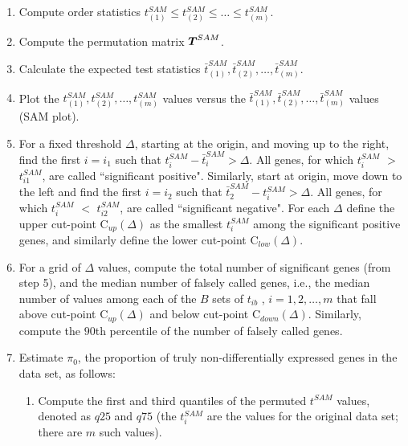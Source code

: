 \documentclass[10pt]{article}
\newcommand{\T}{\mbox{\boldmath $T$}}
\begin{document}
\begin{enumerate}

\item Compute order statistics $t_{(1)}^{SAM} \le t_{(2)}^{SAM} \le
\dots \le t_{(m)}^{SAM}$.

\item Compute the permutation matrix $\T^{SAM}$.

\item Calculate the expected test statistics
$\bar{t}_{(1)}^{SAM},\bar{t}_{(2)}^{SAM},\dots,\bar{t}_{(m)}^{SAM}$.

\item Plot the $t_{(1)}^{SAM} , t_{(2)}^{SAM}, \dots , t_{(m)}^{SAM}$
values versus the
$\bar{t}_{(1)}^{SAM},\bar{t}_{(2)}^{SAM},\dots,\bar{t}_{(m)}^{SAM}$
values (SAM plot).

\item For a fixed threshold $\Delta$, starting at the origin, and
moving up to the right, find the first $i=i_1$ such that
$t_i^{SAM}-\bar{t}_{i}^{SAM} > \Delta$. All genes, for which
$t_i^{SAM}$ $>$ $t_{i1}^{SAM}$, are called ``significant positive".
Similarly, start at origin, move down to the left and find the first
$i=i_2$ such that $\bar{t}_{2}^{SAM}-t_i^{SAM}> \Delta$. All genes,
for which $t_i^{SAM}$ $<$ $t_{i2}^{SAM}$, are called ``significant
negative". For each $\Delta$ define the upper cut-point
C$_{up}(\Delta)$ as the smallest $t_i^{SAM}$ among the significant
positive genes, and similarly define the lower cut-point
C$_{low}(\Delta)$.

\item For a grid of $\Delta$ values, compute the total number of
significant genes (from step 5), and the median number of falsely
called genes, i.e., the median number of values among each of the
$B$ sets of $t_{ib}$ , $i=1,2,\dots,m$ that fall above cut-point
C$_{up}(\Delta)$ and below cut-point C$_{down}(\Delta)$.
Similarly, compute the $90$th percentile of the number of falsely
called genes.

\item Estimate $\pi_0$, the proportion of truly non-differentially
expressed genes in the data set, as follows:

\begin{enumerate}

\item Compute the first and third quantiles of the permuted
$t^{SAM}$ values, denoted as $q25$ and $q75$ (the $t_i^{SAM}$ are
the values for the original data set; there are $m$ such values).


\end{enumerate}
\end{enumerate}
\end{document}
